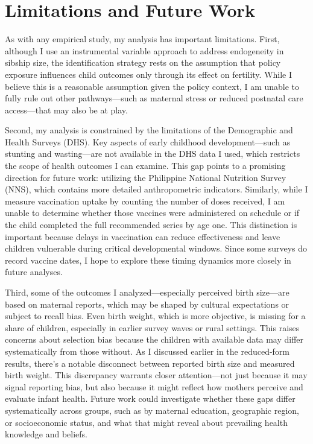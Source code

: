 \documentclass[]{AEA}
\begin{document}
\section{Limitations and Future Work}

As with any empirical study, my analysis has important limitations.
First, although I use an instrumental variable approach to address
endogeneity in sibship size, the identification strategy rests on the
assumption that policy exposure influences child outcomes only through
its effect on fertility. While I believe this is a reasonable assumption
given the policy context, I am unable to fully rule out other
pathways---such as maternal stress or reduced postnatal care
access---that may also be at play.

Second, my analysis is constrained by the limitations of the Demographic
and Health Surveys (DHS). Key aspects of early childhood
development---such as stunting and wasting---are not available in the
DHS data I used, which restricts the scope of health outcomes I can
examine. This gap points to a promising direction for future work:
utilizing the Philippine National Nutrition Survey (NNS), which contains
more detailed anthropometric indicators. Similarly, while I measure
vaccination uptake by counting the number of doses received, I am unable
to determine whether those vaccines were administered on schedule or if
the child completed the full recommended series by age one. This
distinction is important because delays in vaccination can reduce
effectiveness and leave children vulnerable during critical
developmental windows. Since some surveys do record vaccine dates, I
hope to explore these timing dynamics more closely in future analyses.

Third, some of the outcomes I analyzed---especially perceived birth
size---are based on maternal reports, which may be shaped by cultural
expectations or subject to recall bias. Even birth weight, which is more
objective, is missing for a share of children, especially in earlier
survey waves or rural settings. This raises concerns about selection
bias because the children with available data may differ systematically
from those without. As I discussed earlier in the reduced-form results,
there's a notable disconnect between reported birth size and measured
birth weight. This discrepancy warrants closer attention---not just
because it may signal reporting bias, but also because it might reflect
how mothers perceive and evaluate infant health. Future work could
investigate whether these gaps differ systematically across groups, such
as by maternal education, geographic region, or socioeconomic status,
and what that might reveal about prevailing health knowledge and
beliefs.
\end{document}
